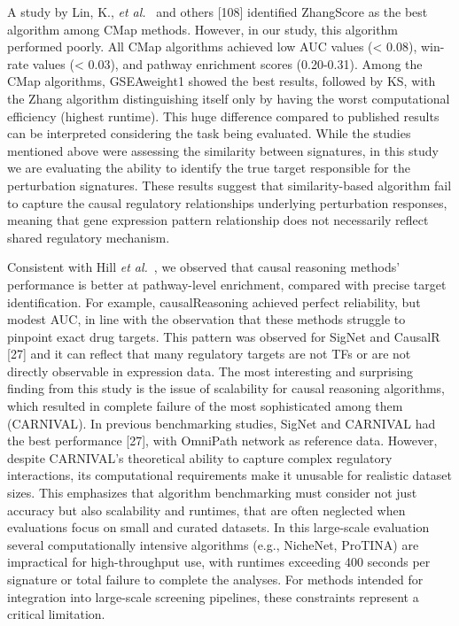A study by Lin, K., \textit{et al.}~\cite{RN79} and others [108] identified ZhangScore as the best algorithm among \gls{CMap} methods. 
However, in our study, this algorithm performed poorly. 
All \gls{CMap} algorithms achieved low \gls{AUC} values (< 0.08), win-rate values (< 0.03), and pathway enrichment scores (0.20-0.31). 
Among the \gls{CMap} algorithms, GSEAweight1 showed the best results, followed by \gls{KS}, with the Zhang algorithm distinguishing itself only by having the worst computational efficiency (highest runtime). 
This huge difference compared to published results can be interpreted considering the task being evaluated. 
While the studies mentioned above were assessing the similarity between signatures, in this study we are evaluating the ability to identify the true target responsible for the perturbation signatures. 
These results suggest that similarity-based algorithm fail to capture the causal regulatory relationships underlying perturbation responses, meaning that gene expression pattern relationship does not necessarily reflect shared regulatory mechanism.

Consistent with Hill \textit{et al.}~\cite{RN37}, we observed that causal reasoning methods' performance is better at pathway-level enrichment, compared with precise target identification. 
For example, causalReasoning achieved perfect reliability, but modest \gls{AUC}, in line with the observation that these methods struggle to pinpoint exact drug targets. 
This pattern was observed for SigNet and CausalR [27] and it can reflect that many regulatory targets are not \gls{TF}s or are not directly observable in expression data. 
The most interesting and surprising finding from this study is the issue of scalability for causal reasoning algorithms, which resulted in complete failure of the most sophisticated among them (\gls{CARNIVAL}). 
In previous benchmarking studies, SigNet and CARNIVAL had the best performance [27], with OmniPath network as reference data. 
However, despite \gls{CARNIVAL}'s theoretical ability to capture complex regulatory interactions, its computational requirements make it unusable for realistic dataset sizes. 
This emphasizes that algorithm benchmarking must consider not just accuracy but also scalability and runtimes, that are often neglected when evaluations focus on small and curated datasets. 
In this large-scale evaluation several computationally intensive algorithms (e.g., NicheNet, ProTINA) are impractical for high-throughput use, with runtimes exceeding 400 seconds per signature or total failure to complete the analyses. 
For methods intended for integration into large-scale screening pipelines, these constraints represent a critical limitation.

